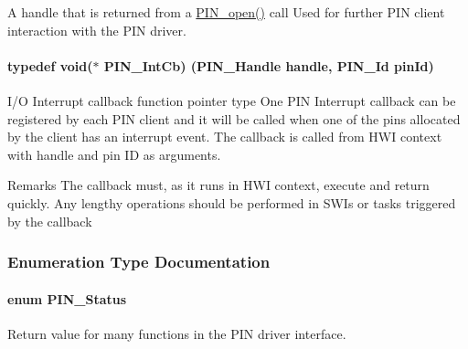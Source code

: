 A handle that is returned from a \hyperlink{_p_i_n_8h_a731c5bb641ffeb064579432adfc8dba0}{P\+I\+N\+\_\+open()} call Used for further P\+I\+N client interaction with the P\+I\+N driver. 

\paragraph[{P\+I\+N\+\_\+\+Int\+Cb}]{\setlength{\rightskip}{0pt plus 5cm}typedef void($\ast$ P\+I\+N\+\_\+\+Int\+Cb) ({\bf P\+I\+N\+\_\+\+Handle} handle, {\bf P\+I\+N\+\_\+\+Id} pin\+Id)}\label{_p_i_n_8h_a289cbfdcb1e23ade7c3b0f5fc3b2d695}


I/\+O Interrupt callback function pointer type One P\+I\+N Interrupt callback can be registered by each P\+I\+N client and it will be called when one of the pins allocated by the client has an interrupt event. The callback is called from H\+W\+I context with handle and pin I\+D as arguments. 

\begin{DoxyRemark}{Remarks}
The callback must, as it runs in H\+W\+I context, execute and return quickly. Any lengthy operations should be performed in S\+W\+Is or tasks triggered by the callback 
\end{DoxyRemark}


\subsubsection{Enumeration Type Documentation}
\paragraph[{P\+I\+N\+\_\+\+Status}]{\setlength{\rightskip}{0pt plus 5cm}enum {\bf P\+I\+N\+\_\+\+Status}}\label{_p_i_n_8h_abe0ad59bbf09e51fe37195a5e70b23f6}


Return value for many functions in the P\+I\+N driver interface. 

